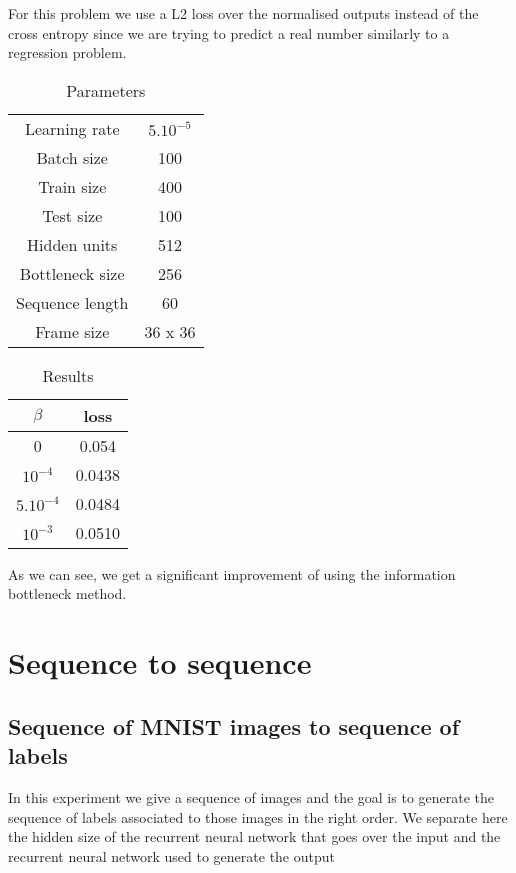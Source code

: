 \documentclass[10pt,oneside,openright]{report}
\begin{document}
For this problem we use a L2 loss over the normalised outputs instead of the cross entropy since we are trying to predict a real number similarly to a regression problem.

\begin {table}[H]
\begin{center}
\begin{tabular}{ c | c  }
 Learning rate & $5.10^{-5}$ \\
 Batch size & 100\\
 Train size & 400 \\
 Test size & 100 \\
 Hidden units & 512 \\
 Bottleneck size & 256 \\
 Sequence length & 60 \\
 Frame size & 36 x 36
\end{tabular}
\end{center}
\caption{Parameters}
\end {table}

\begin {table}[H]
\begin{center}
\begin{tabular}{ c | c }
 $\beta$  & loss \\
 \hline
0  & 0.054 \\
$10^{-4}$  & 0.0438 \\
$5.10^{-4}$  & 0.0484 \\
$10^{-3}$  & 0.0510 \\
\end{tabular}
\end{center}
\caption{Results}
\end {table}

As we can see, we get a significant improvement of using the information bottleneck method.

\section{Sequence to sequence}
\subsection{Sequence of MNIST images to sequence of labels}
In this experiment we give a sequence of images and the goal is to generate the sequence of labels associated to those images in the right order. We separate here the hidden size of the recurrent neural network that goes over the input and the recurrent neural network used to generate the output
\end{document}
